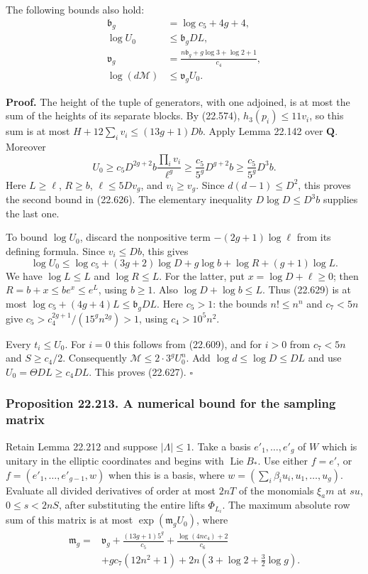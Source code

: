 \documentclass[
  11pt,
  a4paper,
]{article}
\begin{document}
The following bounds also hold: \[
 \begin{split}
 \mathfrak b_g&=\log c_5+4g+4,\\
 \log U_0&\le\mathfrak b_gDL,\\
 \mathfrak v_g&=
   \frac{n\mathfrak b_g+g\log3+\log2+1}{c_4},\\
 \log(d\mathcal M)&\le\mathfrak v_gU_0.
 \end{split}
 \tag{22.627}
\]

\textbf{Proof.} The height of the tuple of generators, with one
adjoined, is at most the sum of the heights of its separate blocks. By
(22.574), \(h_3(p_i)\le11v_i\), so this sum is at most
\(H+12\sum_i v_i\le(13g+1)Db\). Apply Lemma 22.142 over \(\mathbf Q\).
Moreover \[
 U_0\ge c_5D^{2g+2}b\frac{\prod_i v_i}{\ell^g}
 \ge\frac{c_5}{5^g}D^{g+2}b
 \ge\frac{c_5}{5^g}D^3b.
 \tag{22.628}
\] Here \(L\ge\ell\), \(R\ge b\), \(\ell\le5Dv_g\), and \(v_i\ge v_g\).
Since \(d(d-1)\le D^2\), this proves the second bound in (22.626). The
elementary inequality \(D\log D\le D^3b\) supplies the last one.

To bound \(\log U_0\), discard the nonpositive term \(-(2g+1)\log\ell\)
from its defining formula. Since \(v_i\le Db\), this gives \[
 \log U_0\le\log c_5+(3g+2)\log D+g\log b
                  +\log R+(g+1)\log L.
 \tag{22.629}
\] We have \(\log L\le L\) and \(\log R\le L\). For the latter, put
\(x=\log D+\ell\ge0\); then \(R=b+x\le b e^x\le e^L\), using \(b\ge1\).
Also \(\log D+\log b\le L\). Thus (22.629) is at most
\(\log c_5+(4g+4)L\le\mathfrak b_gDL\). Here \(c_5>1\): the bounds
\(n!\le n^n\) and \(c_7<5n\) give \(c_5>c_4^{2g+1}/(15^gn^{2g})>1\),
using \(c_4>10^5n^2\).

Every \(t_i\le U_0\). For \(i=0\) this follows from (22.609), and for
\(i>0\) from \(c_7<5n\) and \(S\ge c_4/2\). Consequently
\(\mathcal M\le2\cdot3^gU_0^n\). Add \(\log d\le\log D\le DL\) and use
\(U_0=\Theta DL\ge c_4DL\). This proves (22.627). \(\square\)

\subsubsection{Proposition 22.213. A numerical bound for the sampling
matrix}\label{proposition-22.213.-a-numerical-bound-for-the-sampling-matrix}

Retain Lemma 22.212 and suppose \(|\Lambda|\le1\). Take a basis
\(e'_1,\ldots,e'_g\) of \(W\) which is unitary in the elliptic
coordinates and begins with \(\operatorname{Lie}B_*\). Use either
\(f=e'\), or \(f=(e'_1,\ldots,e'_{g-1},w)\) when this is a basis, where
\(w=(\sum_i\beta_i u_i,u_1,\ldots,u_g)\). Evaluate all divided
derivatives of order at most \(2nT\) of the monomials \(\xi_a m\) at
\(su\), \(0\le s<2nS\), after substituting the entire lifts
\(\Phi_{L_i}\). The maximum absolute row sum of this matrix is at most
\(\exp(\mathfrak m_gU_0)\), where \[
 \begin{split}
 \mathfrak m_g={}&\mathfrak v_g+
       \frac{(13g+1)5^g}{c_5}
       +\frac{\log(4nc_4)+2}{c_6}\\
       &+g c_7(12n^2+1)
       +2n\left(3+\log2+\frac32\log g\right).
 \end{split}
 \tag{22.630}
\]
\end{document}
